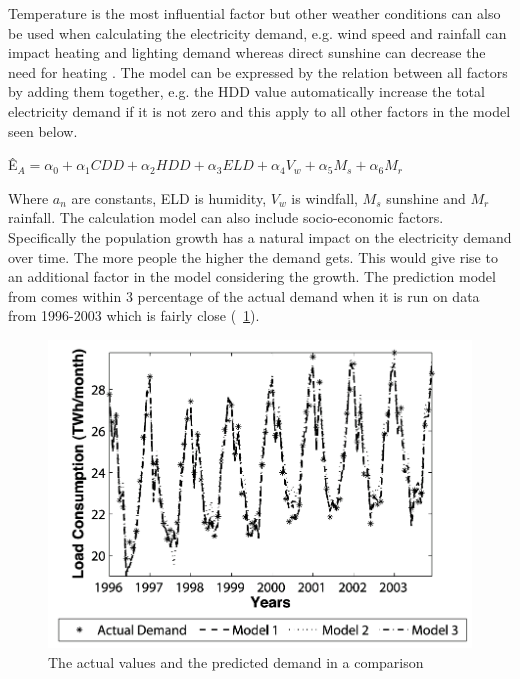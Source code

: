 \documentclass[twoside,11pt,openright]{report}
\begin{document}
Temperature is the most influential factor but other weather conditions can also be used when calculating the electricity demand, e.g. wind speed and rainfall can impact heating and lighting demand whereas direct sunshine can decrease the need for heating \cite{19}. The model can be expressed by the relation between all factors by adding them together, e.g. the HDD value automatically increase the total electricity demand if it is not zero and this apply to all other factors in the model seen below.

\begin{center} \^E$_{A}=\alpha_{0}+\alpha_{1}CDD+\alpha_{2}HDD+\alpha_{3}ELD
+\alpha_{4}V_{w}+\alpha_{5}M_{s}+\alpha_{6}M_{r}$ 
\end{center} 
 
Where $a_{n}$ are constants, ELD is humidity, $V_{w}$ is windfall, $M_{s}$ sunshine and $M_{r}$ rainfall.
The calculation model can also include socio-economic factors. Specifically the population growth has a natural impact on the electricity demand over time. The more people the higher the demand gets. This would give rise to an additional factor in the model considering the growth. The prediction model from \cite{19} comes within 3 percentage of the actual demand when it is run on data from 1996-2003 which is fairly close (~\ref{fig:predicteddemand}).
\newline
\begin{figure}[h!]
\centering
\includegraphics[width=0.8\linewidth,natwidth=898,natheight=587]{billeder/PredictionOfDemand.png}
\caption{The actual values and the predicted demand in a comparison \cite{19}}
\label{fig:predicteddemand}
\end{figure}

\end{document}
